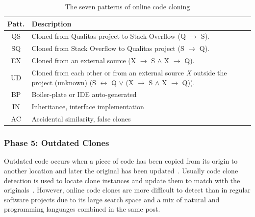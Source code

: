 \documentclass[sigconf,review, anonymous]{acmart}
\begin{document}
\begin{table}
	\centering
	\caption{The seven patterns of online code cloning}
	\label{tab:classification_scheme}
        \small\vspace{-1ex}
		\begin{tabular}{c@{~~}p{7.35cm}}
			\hline 
			Patt. & Description \\ 
			\hline 
			QS & Cloned from Qualitas project to Stack Overflow (Q $\rightarrow$ S). \\ 

			SQ &Cloned from Stack Overflow to Qualitas project (S $\rightarrow$ Q). \\ 

			EX & Cloned from an external source (X $\rightarrow$ S $\wedge$ X $\rightarrow$ Q). \\

			UD & Cloned from each other or from an external source \textit{X} outside the project (unknown) (S $\leftrightarrow$ Q $\vee$ (X $\rightarrow$ S $\wedge$ X $\rightarrow$ Q)). \\ 
			\hline 
			BP & Boiler-plate or IDE auto-generated \\ 

			IN & Inheritance, interface implementation  \\ 

			AC & Accidental similarity, false clones \\ 
			\hline 
		\end{tabular}  %
\end{table}

\subsubsection{Phase 5: Outdated Clones}
Outdated code occurs when a piece of code has been copied from its
origin to another location and later the original has been
updated~\cite{Xia2014}. Usually code clone detection is used to locate
clone instances and update them to match with the
originals~\cite{Bellon2007}. However, online code clones are more
difficult to detect than in regular software projects due to its large
search space and a mix of natural and programming languages combined
in the same post.
\end{document}
